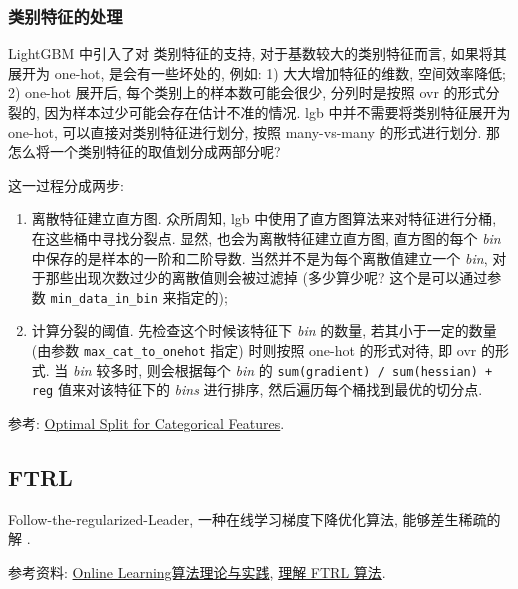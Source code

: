 \subsubsection{类别特征的处理}
LightGBM 中引入了对 类别特征的支持, 对于基数较大的类别特征而言, 如果将其展开为 one-hot, 是会有一些坏处的, 例如: 1) 大大增加特征的维数, 空间效率降低; 2) one-hot 展开后, 每个类别上的样本数可能会很少, 分列时是按照 ovr 的形式分裂的, 因为样本过少可能会存在估计不准的情况. lgb 中并不需要将类别特征展开为 one-hot, 可以直接对类别特征进行划分, 按照 many-vs-many 的形式进行划分. 那怎么将一个类别特征的取值划分成两部分呢?

这一过程分成两步:
\begin{enumerate}
	\item 离散特征建立直方图. 众所周知, lgb 中使用了直方图算法来对特征进行分桶, 在这些桶中寻找分裂点. 显然, 也会为离散特征建立直方图, 直方图的每个 \textit{bin} 中保存的是样本的一阶和二阶导数. 当然并不是为每个离散值建立一个 \textit{bin}, 对于那些出现次数过少的离散值则会被过滤掉 (多少算少呢? 这个是可以通过参数 \texttt{min_data_in_bin} 来指定的);
	
	\item 计算分裂的阈值. 先检查这个时候该特征下 \textit{bin} 的数量, 若其小于一定的数量 (由参数 \texttt{max_cat_to_onehot} 指定) 时则按照 one-hot 的形式对待, 即 ovr 的形式. 当 \textit{bin} 较多时, 则会根据每个 \textit{bin} 的 \texttt{sum(gradient) / sum(hessian) + reg} 值来对该特征下的 \textit{bins} 进行排序, 然后遍历每个桶找到最优的切分点.
\end{enumerate}

参考: \href{https://lightgbm.readthedocs.io/en/latest/Features.html#optimal-split-for-categorical-features}{Optimal Split for Categorical Features}.

\subsection{FTRL}
Follow-the-regularized-Leader\cite{hb_ftrl_2010_colt}, 一种在线学习梯度下降优化算法, 能够差生稀疏的解 .

参考资料: \href{https://tech.meituan.com/2016/04/21/online-learning.html}{Online Learning算法理论与实践}, \href{http://vividfree.github.io/%E6%9C%BA%E5%99%A8%E5%AD%A6%E4%B9%A0/2015/12/05/understanding-FTRL-algorithm}{理解 FTRL 算法}.